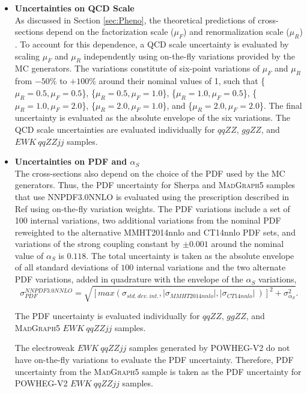 \begin{itemize}
\item{\textbf{Uncertainties on QCD Scale}\\ As discussed in Section \ref{sec:Pheno}, the theoretical predictions of cross-sections depend on the factorization scale ($\mu_{F}$) and renormalization scale ($\mu_{R}$) \cite{QCDScaleAndPDFUnc}. To account for this dependence, a QCD scale uncertainty is evaluated by scaling $\mu_{F}$ and $\mu_{R}$ independently using on-the-fly variations provided by the MC generators. The variations constitute of six-point variations of $\mu_{F}$ and $\mu_{R}$ from $-50\%$ to $+100\%$ around their nominal values of 1, such that \{$\mu_R = 0.5, \mu_F = 0.5$\}, \{$\mu_R = 0.5, \mu_F = 1.0$\}, \{$\mu_R = 1.0, \mu_F = 0.5$\}, \{$\mu_R = 1.0, \mu_F = 2.0$\}, \{$\mu_R = 2.0, \mu_F = 1.0$\}, and \{$\mu_R = 2.0, \mu_F = 2.0$\}. The final uncertainty is evaluated as the absolute envelope of the six variations. The QCD scale uncertainties are evaluated individually for $qqZZ$, $ggZZ$, and $EWK~ qqZZjj$ samples.
}
\item{\textbf{Uncertainties on PDF and $\alpha_{S}$}\\ The cross-sections also depend on the choice of the PDF used by the MC generators. Thus, the PDF uncertainty for Sherpa and \textsc{MadGraph5} samples that use NNPDF3.0NNLO is evaluated using the prescription described in Ref \cite{PDFForRunII} using on-the-fly variation weights. The PDF variations include a set of 100 internal variations, two additional variations from the nominal PDF reweighted to the alternative MMHT2014nnlo \cite{MMHT2014PDFs} and CT14nnlo \cite{CT14nnlo} PDF sets, and variations of the strong coupling constant by $\pm0.001$ around the nominal value of $\alpha_{S}$ is $0.118$. The total uncertainty is taken as the absolute envelope of all standard deviations of $100$ internal variations and the two alternate PDF variations, added in quadrature with the envelope of the $\alpha_{S}$ variations, 
\begin{equation}
    \sigma_{PDF}^{NNPDF3.0NNLO} = \sqrt{ [ max (\sigma_{std.~dev.~int.}, |\sigma_{MMHT2014nnlo}| , |\sigma_{CT14nnlo}|~)]^2 + \sigma_{\alpha_S}^2 }.
\end{equation}

The PDF uncertainty is evaluated individually for $qqZZ$, $ggZZ$, and \textsc{MadGraph5} $EWK~ qqZZjj$ samples.

The electroweak $EWK~qqZZjj$ samples generated by \textsc{POWHEG-V2} do not have on-the-fly variations to evaluate the PDF uncertainty. Therefore, PDF uncertainty from the \textsc{MadGraph5} sample is taken as the PDF uncertainty for \textsc{POWHEG-V2} $EWK~qqZZjj$ samples.
}


\end{itemize}
